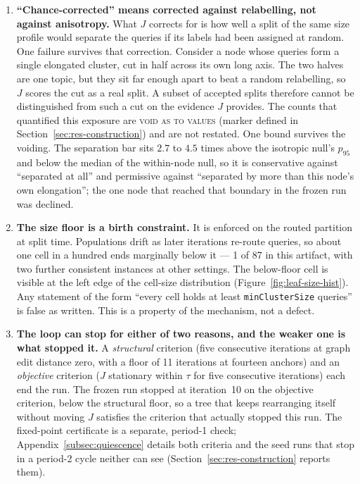 \begin{enumerate}
\item \textbf{``Chance-corrected'' means corrected against relabelling,
not against anisotropy.} What $J$ corrects for is how well a split of
the same size profile would separate the queries if its labels had been
assigned at random. One failure survives that correction. Consider a
node whose queries form a single elongated cluster, cut in half across
its own long axis. The two halves are one topic, but they sit far
enough apart to beat a random relabelling, so $J$ scores the cut as a
real split. A subset of accepted splits therefore cannot be
distinguished from such a cut on the evidence $J$ provides. The counts
that quantified this exposure are \textsc{void as to values} (marker
defined in Section~\ref{sec:res-construction}) and are not restated.
One bound survives the voiding. The separation bar sits $2.7$ to $4.5$
times above the isotropic null's $p_{95}$ and below the median of the
within-node null, so it is conservative against ``separated at all''
and permissive against ``separated by more than this node's own
elongation''; the one node that reached that boundary in the frozen run
was declined.

\item \textbf{The size floor is a birth constraint.} It is enforced on
the routed partition at split time. Populations drift as later
iterations re-route queries, so about one cell in a hundred ends
marginally below it --- 1 of 87 in this artifact, with two further
consistent instances at other settings. The below-floor cell is visible
at the left edge of the cell-size distribution
(Figure~\ref{fig:leaf-size-hist}). Any statement of the form ``every
cell holds at least \texttt{minClusterSize} queries'' is false as
written. This is a property of the mechanism, not a defect.

\item \textbf{The loop can stop for either of two reasons, and the
weaker one is what stopped it.} A \emph{structural} criterion (five
consecutive iterations at graph edit distance zero, with a floor of
11 iterations at fourteen anchors) and an \emph{objective} criterion
($J$ stationary within $\tau$ for five consecutive iterations) each
end the run. The frozen run stopped at iteration~10 on the objective
criterion, below the structural floor, so a tree that keeps
rearranging itself without moving $J$ satisfies the criterion that
actually stopped this run. The fixed-point certificate is a separate,
period-1 check; Appendix~\ref{subsec:quiescence} details both
criteria and the seed runs that stop in a period-2 cycle neither can
see (Section~\ref{sec:res-construction} reports them).


\end{enumerate}
